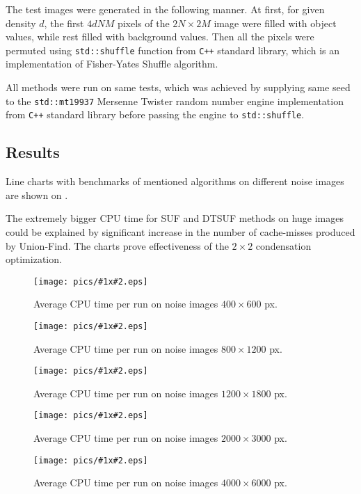 \documentclass[hidelinks]{llncs}
\newcommand{\CXX}{\texttt{C++} \xspace}
\begin{document}
The test images were generated in the following manner. At first, for given
density $d$, the first $4dNM$ pixels of the $2N \times 2M$ image were filled
with object values, while rest filled with background values. Then all the
pixels were permuted using \texttt{std::shuffle} function from \CXX standard
library, which is an implementation of Fisher-Yates Shuffle
algorithm\cite{fisher:yates}.

All methods were run on same tests, which was achieved by supplying same seed
to the \texttt{std::mt19937} Mersenne Twister\cite{mt19937} random number
engine implementation from \CXX standard library before passing the engine to
\texttt{std::shuffle}.

\subsection{Results}

Line charts with benchmarks of mentioned algorithms on different noise images
are shown on
.

The extremely bigger CPU time for SUF and DTSUF methods on huge images could be
explained by significant increase in the number of cache-misses produced by
Union-Find. The charts prove effectiveness of the $2 \times 2$ condensation
optimization.  

\newcommand{\inputtable}[2]{
  \begin{figure}
    \centering
    \texttt{[image: pics/\#1x\#2.eps]}
    \caption{Average CPU time per run on noise images $#1 \times #2$ px.}
    \label{fig:noise#1x#2}
  \end{figure}
}

\inputtable{400}{600}
\inputtable{800}{1200}
\inputtable{1200}{1800}
\inputtable{2000}{3000}
\inputtable{4000}{6000}

\end{document}
